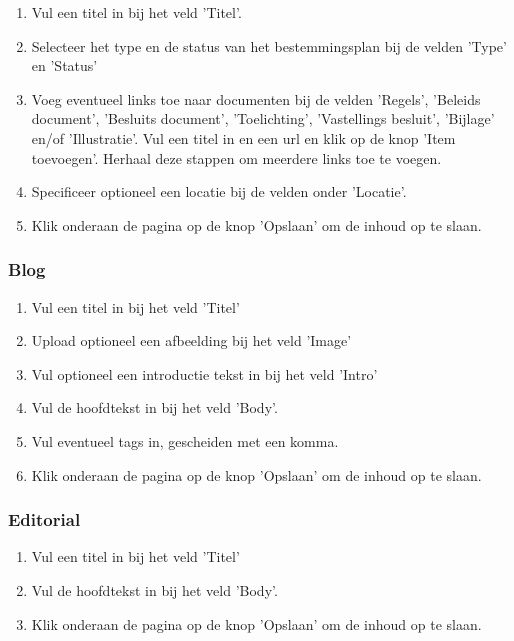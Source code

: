 \begin{enumerate}
\item Vul een titel in bij het veld 'Titel'.
\item Selecteer het type en de status van het bestemmingsplan bij de velden 'Type' en 'Status'
\item Voeg eventueel links toe naar documenten bij de velden 'Regels', 'Beleids document', 'Besluits document', 'Toelichting', 'Vastellings besluit', 'Bijlage' en/of 'Illustratie'. Vul een titel in en een url en klik op de knop 'Item toevoegen'. Herhaal deze stappen om meerdere links toe te voegen. 
\item Specificeer optioneel een locatie bij de velden onder 'Locatie'.
\item Klik onderaan de pagina op de knop 'Opslaan' om de inhoud op te slaan.
\end{enumerate}

\subsubsection{Blog}\label{blog}

\begin{enumerate}
\item Vul een titel in bij het veld 'Titel'
\item Upload optioneel een afbeelding bij het veld 'Image'
\item Vul optioneel een introductie tekst in bij het veld 'Intro'
\item Vul de hoofdtekst in bij het veld 'Body'.
\item Vul eventueel tags in, gescheiden met een komma.
\item Klik onderaan de pagina op de knop 'Opslaan' om de inhoud op te slaan.
\end{enumerate}

\subsubsection{Editorial}\label{editorial}

\begin{enumerate}
\item Vul een titel in bij het veld 'Titel'
\item Vul de hoofdtekst in bij het veld 'Body'.
\item Klik onderaan de pagina op de knop 'Opslaan' om de inhoud op te slaan.
\end{enumerate}

